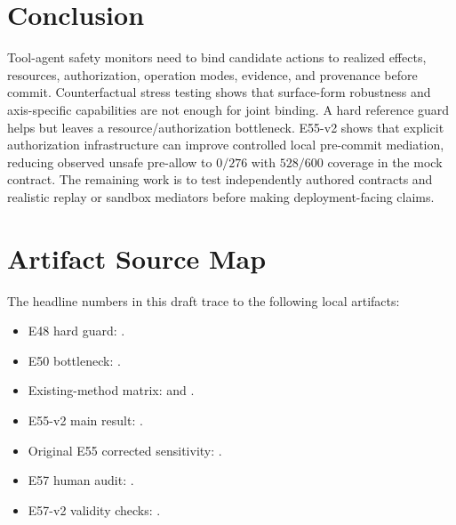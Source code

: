 \documentclass[10pt,twocolumn]{article}
\begin{document}
\section{Conclusion}

Tool-agent safety monitors need to bind candidate actions to realized effects, resources, authorization, operation modes, evidence, and provenance before commit. Counterfactual stress testing shows that surface-form robustness and axis-specific capabilities are not enough for joint binding. A hard reference guard helps but leaves a resource/authorization bottleneck. E55-v2 shows that explicit authorization infrastructure can improve controlled local pre-commit mediation, reducing observed unsafe pre-allow to $0/276$ with $528/600$ coverage in the mock contract. The remaining work is to test independently authored contracts and realistic replay or sandbox mediators before making deployment-facing claims.

\appendix

\section{Artifact Source Map}

The headline numbers in this draft trace to the following local artifacts:
\begin{itemize}
  \item E48 hard guard: .
  \item E50 bottleneck: .
  \item Existing-method matrix:  and .
  \item E55-v2 main result: .
  \item Original E55 corrected sensitivity: .
  \item E57 human audit: .
  \item E57-v2 validity checks: .
\end{itemize}
\end{document}
